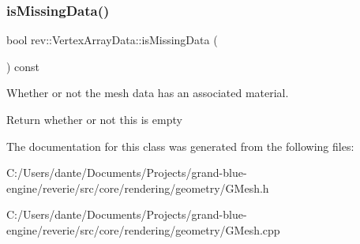 \subsubsection{\texorpdfstring{isMissingData()}{isMissingData()}}
{\footnotesize\ttfamily bool rev\+::\+Vertex\+Array\+Data\+::is\+Missing\+Data (\begin{DoxyParamCaption}{ }\end{DoxyParamCaption}) const\hspace{0.3cm}{\ttfamily [inline]}}



Whether or not the mesh data has an associated material. 

Return whether or not this is empty 

The documentation for this class was generated from the following files\+:\begin{DoxyCompactItemize}
\item 
C\+:/\+Users/dante/\+Documents/\+Projects/grand-\/blue-\/engine/reverie/src/core/rendering/geometry/G\+Mesh.\+h\item 
C\+:/\+Users/dante/\+Documents/\+Projects/grand-\/blue-\/engine/reverie/src/core/rendering/geometry/G\+Mesh.\+cpp\end{DoxyCompactItemize}
